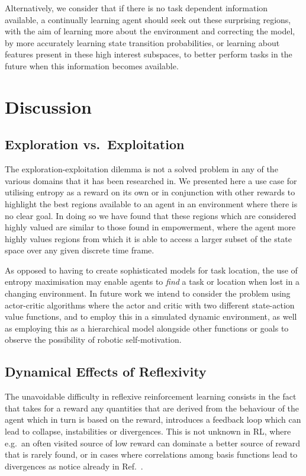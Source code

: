 \documentclass{article}
\begin{document}
Alternatively, we consider that if there is no task dependent information available, a continually learning agent should seek out these surprising regions, with the aim of learning more about the environment and correcting the model, by more accurately learning state transition probabilities, or learning about features present in these high interest subspaces, to better perform tasks in the future when this information becomes available.


\section{Discussion\label{Discussion}}

\subsection{Exploration vs.~Exploitation}

The exploration-exploitation dilemma is not a solved problem in any of the various domains that it has been researched in. We presented here a use case for utilising entropy as a reward on its own or in conjunction with other rewards to highlight the best regions available to an agent in an environment where there is no clear goal. In doing so we have found that these regions which are considered highly valued are similar to those found in empowerment, where the agent more highly values regions from which it is able to access a larger subset of the state space over any given discrete time frame.

As opposed to having to create sophisticated models for task location, the use of entropy maximisation may enable agents to \emph{find} a task or location when lost in a changing environment. In future work we intend to consider the problem using actor-critic algorithms where the actor and critic with two different state-action value functions, and to employ this in a simulated dynamic environment, as well as employing this as a hierarchical model alongside other functions or goals to observe the possibility of robotic self-motivation.

\subsection{Dynamical Effects of Reflexivity}

The unavoidable difficulty in reflexive reinforcement learning consists in the 
fact that takes for a reward any quantities that are derived from the behaviour of the agent
which in turn is based on the reward,
introduces a feedback loop which can lead to collapse, instabilities or divergences. 
This is not unknown in RL, where e.g.~an often visited source of low reward can dominate a better source of reward that is rarely found, or in cases where correlations among basis functions lead to divergences as notice already in Ref.~\citep{baird1995residual}. 
\end{document}
